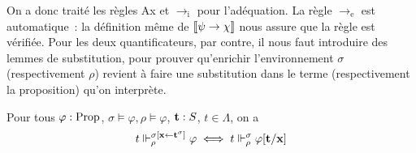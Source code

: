 \documentclass{article}
\begin{document}
On a donc traité les règles Ax et $\to_\mathrm i$ pour l'adéquation. La règle $\to_\mathrm e$ est automatique~: la définition même de $\llbracket \psi\to\chi \rrbracket$ nous assure que la règle est vérifiée. Pour les deux quantificateurs, par contre, il nous faut introduire des lemmes de substitution, pour prouver qu'enrichir l'environnement $\sigma$ (respectivement $\rho$) revient à faire une substitution dans le terme (respectivement la proposition) qu'on interprète.

\begin{lem}\label{lem.subst.1}
  Pour tous $\varphi : \mathrm{Prop}$, $\sigma\models\varphi,\rho\models\varphi$, $\mathbf{t} : S$, $t\in\Lambda$, on a
  \[t\Vdash_\rho^{\sigma[\mathbf{x} \leftarrow \mathbf{t}^\sigma]} \varphi\iff t\Vdash_\rho^\sigma \varphi[\mathbf{t}/\mathbf{x}]\]
\end{lem}
\end{document}
